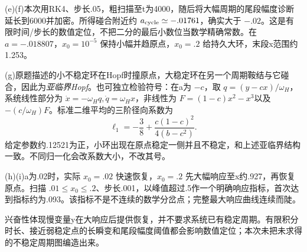 \begin{solution}
(e)(f)本次用RK4、步长.05，粗扫描至t为4000，随后将大幅周期的尾段幅度诊断延长到6000并加密。所得碰合附近约 $a_{\rm cycle}\simeq-.01761$，确实大于 $-.02$。这是有限时间/步长的数值定位，不把二分的最后小数位当数学精确常数。在 $a=-.018807$，$x_0=10^{-5}$ 保持小幅并趋原点，$x_0=.2$ 给持久大环，末段x范围约1.253。
\begin{center}\end{center}

(g)原题描述的小不稳定环在Hopf时撞原点，大稳定环在另一个周期鞍结与它碰合，因此为\emph{亚临界Hopf}。也可独立检验符号：在a为 $-c$，取 $q=(y-cx)/\omega_H$，系统线性部分为 $\dot x=-\omega_Hq,\dot q=\omega_Hx$，非线性为 $F=(1-c)x^2-x^3$以及 $-(c/\omega_H)F$。标准二维平均的三阶径向系数为
\[
 \ell_1=-\frac38+\frac{c(1-c)^2}{4(b-c^2)}.
\]
给定参数约.12521为正，小环出现在原点稳定一侧并且不稳定，和上述亚临界结构一致。不同归一化会改系数大小，不改其号。

(h)(i)a为.02时，实际 $x_0=.02$ 快速恢复，$x_0=.2$ 先大幅响应至x约.927，再恢复原点。扫描 $.01\le x_0\le.2$、步长.001，以峰值超过.5作一个明确响应指标，首次达到指标约为.093。该指标不是不连续的数学分岔点；完整最大响应曲线连续而陡。
\begin{center}\end{center}
兴奋性体现慢变量y在大响应后提供恢复，并不要求系统已有稳定周期。有限积分时长、接近弱稳定点的长瞬变和尾段幅度阈值都会影响数值定位；本次未把未求得的不稳定周期图编造出来。
\end{solution}

